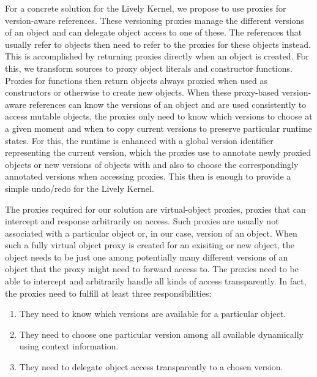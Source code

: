 

For a concrete solution for the Lively Kernel, we propose to use proxies for version-aware references.
These versioning proxies manage the different versions of an object and can delegate object access to one of these.
The references that usually refer to objects then need to refer to the proxies for these objects instead. 
This is accomplished by returning proxies directly when an object is created.
For this, we transform sources to proxy object literals and constructor functions.
Proxies for functions then return objects always proxied when used as constructors or otherwise to create new objects.
When these proxy-based version-aware references can know the versions of an object and are used consistently to access mutable objects, the proxies only need to know which versions to choose at a given moment and when to copy current versions to preserve particular runtime states.
For this, the runtime is enhanced with a global version identifier representing the current version, which the proxies use to annotate newly proxied objects or new versions of objects with and also to choose the correspondingly annotated versions when accessing proxies.
This then is enough to provide a simple undo/redo for the Lively Kernel.


The proxies required for our solution are virtual-object proxies, proxies that can intercept and response arbitrarily on access.
Such proxies are usually not associated with a particular object or, in our case, version of an object.
When such a fully virtual object proxy is created for an exisiting or new object, the object needs to be just one among potentially many different versions of an object that the proxy might need to forward access to.
The proxies need to be able to intercept and arbitrarily handle all kinds of access transparently.
In fact, the proxies need to fulfill at least three responsibilities:
\begin{enumerate}
    \item They need to know which versions are available for a particular object.
    \item They need to choose one particular version among all available dynamically using context information.
    \item They need to delegate object access transparently to a chosen version.
\end{enumerate}


